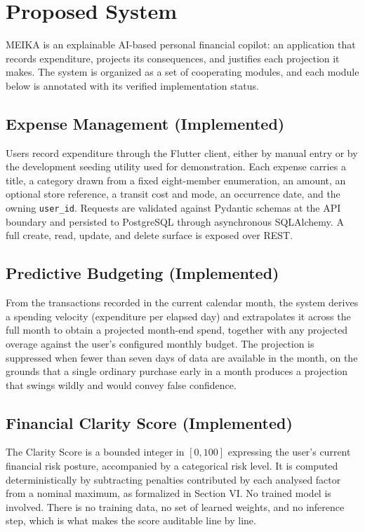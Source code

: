 \documentclass[conference]{IEEEtran}
\begin{document}
\section{Proposed System}

MEIKA is an explainable AI-based personal financial copilot: an application that records expenditure, projects its consequences, and justifies each projection it makes. The system is organized as a set of cooperating modules, and each module below is annotated with its verified implementation status.

\subsection{Expense Management (Implemented)}

Users record expenditure through the Flutter client, either by manual entry or by the development seeding utility used for demonstration. Each expense carries a title, a category drawn from a fixed eight-member enumeration, an amount, an optional store reference, a transit cost and mode, an occurrence date, and the owning \texttt{user\_id}. Requests are validated against Pydantic schemas at the API boundary and persisted to PostgreSQL through asynchronous SQLAlchemy. A full create, read, update, and delete surface is exposed over REST.

\subsection{Predictive Budgeting (Implemented)}

From the transactions recorded in the current calendar month, the system derives a spending velocity (expenditure per elapsed day) and extrapolates it across the full month to obtain a projected month-end spend, together with any projected overage against the user's configured monthly budget. The projection is suppressed when fewer than seven days of data are available in the month, on the grounds that a single ordinary purchase early in a month produces a projection that swings wildly and would convey false confidence.

\subsection{Financial Clarity Score (Implemented)}

The Clarity Score is a bounded integer in $[0, 100]$ expressing the user's current financial risk posture, accompanied by a categorical risk level. It is computed deterministically by subtracting penalties contributed by each analysed factor from a nominal maximum, as formalized in Section VI. No trained model is involved. There is no training data, no set of learned weights, and no inference step, which is what makes the score auditable line by line.
\end{document}

